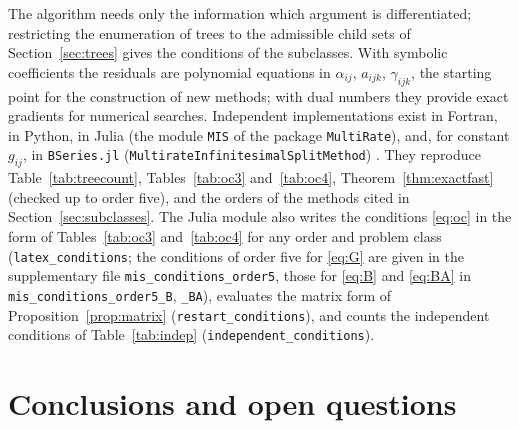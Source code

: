 \documentclass[11pt,a4paper]{article}
\theoremstyle{definition}
\theoremstyle{remark}
\begin{document}
The algorithm needs only the information which argument is differentiated; restricting the enumeration of trees to the
admissible child sets of Section~\ref{sec:trees} gives the conditions of the subclasses. With symbolic coefficients the
residuals are polynomial equations in $\alpha_{ij}$, $a_{ijk}$, $\gamma_{ijk}$, the starting point for the construction
of new methods; with dual numbers they provide exact gradients for numerical searches. Independent implementations exist
in Fortran, in Python, in Julia (the module \texttt{MIS} of the package \texttt{MultiRate}), and, for constant $g_{ij}$,
in \texttt{BSeries.jl} (\texttt{MultirateInfinitesimalSplitMethod}) \cite{KetchesonRanocha2023}. They reproduce
Table~\ref{tab:treecount}, Tables~\ref{tab:oc3} and~\ref{tab:oc4}, Theorem~\ref{thm:exactfast} (checked up to order five),
and the orders of the methods cited in Section~\ref{sec:subclasses}. The Julia module also writes the conditions
\eqref{eq:oc} in the form of Tables~\ref{tab:oc3} and~\ref{tab:oc4} for any order and problem class
(\texttt{latex\_conditions}; the conditions of order five for \eqref{eq:G} are given in the supplementary file
\texttt{mis\_conditions\_order5}, those for \eqref{eq:B} and \eqref{eq:BA} in \texttt{mis\_conditions\_order5\_B},
\texttt{\_BA}), evaluates the matrix form of Proposition~\ref{prop:matrix} (\texttt{restart\_conditions}), and counts the
independent conditions of Table~\ref{tab:indep} (\texttt{independent\_conditions}).

\section{Conclusions and open questions}
\label{sec:conclusions}
\end{document}
